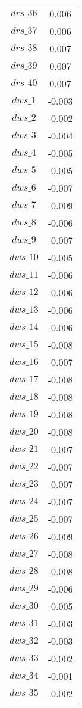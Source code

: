 \begin{center}
\begin{longtable}{cc}
$drs\_36$ 	 & 	 0.006 \\
$drs\_37$ 	 & 	 0.006 \\
$drs\_38$ 	 & 	 0.007 \\
$drs\_39$ 	 & 	 0.007 \\
$drs\_40$ 	 & 	 0.007 \\
$dws\_1$ 	 & 	 -0.003 \\
$dws\_2$ 	 & 	 -0.002 \\
$dws\_3$ 	 & 	 -0.004 \\
$dws\_4$ 	 & 	 -0.005 \\
$dws\_5$ 	 & 	 -0.005 \\
$dws\_6$ 	 & 	 -0.007 \\
$dws\_7$ 	 & 	 -0.009 \\
$dws\_8$ 	 & 	 -0.006 \\
$dws\_9$ 	 & 	 -0.007 \\
$dws\_10$ 	 & 	 -0.005 \\
$dws\_11$ 	 & 	 -0.006 \\
$dws\_12$ 	 & 	 -0.006 \\
$dws\_13$ 	 & 	 -0.006 \\
$dws\_14$ 	 & 	 -0.006 \\
$dws\_15$ 	 & 	 -0.008 \\
$dws\_16$ 	 & 	 -0.007 \\
$dws\_17$ 	 & 	 -0.008 \\
$dws\_18$ 	 & 	 -0.008 \\
$dws\_19$ 	 & 	 -0.008 \\
$dws\_20$ 	 & 	 -0.008 \\
$dws\_21$ 	 & 	 -0.007 \\
$dws\_22$ 	 & 	 -0.007 \\
$dws\_23$ 	 & 	 -0.007 \\
$dws\_24$ 	 & 	 -0.007 \\
$dws\_25$ 	 & 	 -0.007 \\
$dws\_26$ 	 & 	 -0.009 \\
$dws\_27$ 	 & 	 -0.008 \\
$dws\_28$ 	 & 	 -0.008 \\
$dws\_29$ 	 & 	 -0.006 \\
$dws\_30$ 	 & 	 -0.005 \\
$dws\_31$ 	 & 	 -0.003 \\
$dws\_32$ 	 & 	 -0.003 \\
$dws\_33$ 	 & 	 -0.002 \\
$dws\_34$ 	 & 	 -0.001 \\
$dws\_35$ 	 & 	 -0.002 \\

\end{longtable}
\end{center}
